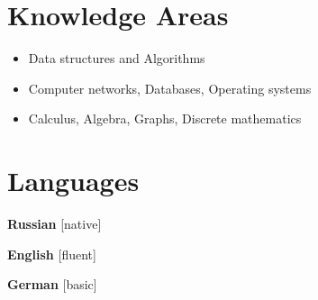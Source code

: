 \documentclass[11pt,a4paper,roman]{moderncv}        %
\begin{document}
\section{Knowledge Areas}
{\begin{itemize}
    \item Data structures and Algorithms
    \item Computer networks, Databases, Operating systems
    \item Calculus, Algebra, Graphs, Discrete mathematics
  \end{itemize}}

\section{Languages}
{\begin{multicols}{3}
\textbf{Russian} [native]

\textbf{English} [fluent]

\textbf{German} [basic]


\end{multicols}
}



\end{document}
